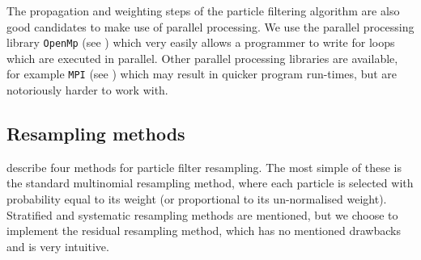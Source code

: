 The propagation and weighting steps of the particle filtering algorithm are also good candidates to make use of parallel
processing. We use the parallel processing library \texttt{OpenMp} (see \cite{openmp}) which very easily allows a
programmer to write for loops which are executed in parallel. Other parallel processing libraries are available, for
example \texttt{MPI} (see \cite{mpi}) which may result in quicker program run-times, but are notoriously harder to work
with.

\subsection{Resampling methods} 
\label{sec:Resampling_methods}

\cite{Douc2005} describe four methods for particle filter resampling. The most simple of these is the standard
multinomial resampling method, where each particle is selected with probability equal to its weight (or proportional to
its un-normalised weight). Stratified and systematic resampling methods are mentioned, but we choose to implement the
residual resampling method, which has no mentioned drawbacks and is very intuitive.

